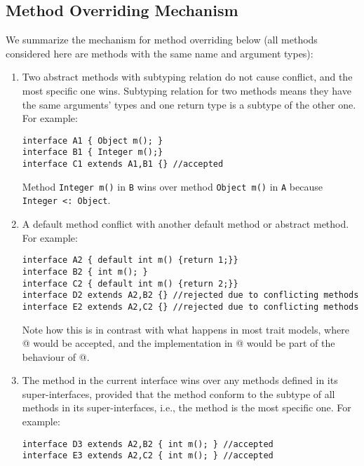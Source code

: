 \begin{comment}
\subsubsection{Subtyping}

\[ \inferrule{}{T <: T} \]

\[ \inferrule{S <: T \\ T <: U}{S <: U}\]

\[ \inferrule{\emph{ann} \spc \textbf{interface} \spc C_0 \spc \textbf{extends} \spc C_1,...,C_k \{...\}}
{C_0 <: C_1 \\ ... \\ C_0 <: C_k} \]
\end{comment}

\subsection{Method Overriding Mechanism}
We summarize the mechanism for method overriding below (all methods considered
here are methods with the same name and argument types):
\begin{enumerate}
\item Two abstract methods with subtyping relation do not cause conflict, and the
most specific one wins. Subtyping relation for two methods means they have the
same arguments' types and one return type is a subtype of the other one. For
example:
\begin{lstlisting}
interface A1 { Object m(); }
interface B1 { Integer m();}
interface C1 extends A1,B1 {} //accepted
\end{lstlisting}
Method \texttt{Integer m()} in \texttt{B} wins over method \texttt{Object m()}
in \texttt{A} because \texttt{Integer <: Object}.

\item A default method conflict with another default method or abstract method. For
example:
\begin{lstlisting}
interface A2 { default int m() {return 1;}}
interface B2 { int m(); }
interface C2 { default int m() {return 2;}}
interface D2 extends A2,B2 {} //rejected due to conflicting methods
interface E2 extends A2,C2 {} //rejected due to conflicting methods
\end{lstlisting}
Note how this is in contrast with what happens in most trait models, where @ would be accepted, and the implementation in @ would be part of the behaviour of @.

\item The method in the current interface wins over any methods defined in its
super-interfaces, provided that the method conform to the subtype of all methods
in its super-interfaces, i.e., the method is the most specific one. For example:
\begin{lstlisting}
interface D3 extends A2,B2 { int m(); } //accepted
interface E3 extends A2,C2 { int m(); } //accepted
\end{lstlisting}
\end{enumerate}
